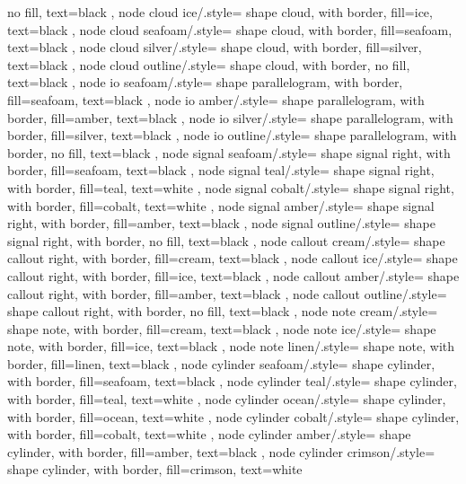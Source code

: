 {{		no fill, text=black
	},
	node cloud ice/.style={
		shape cloud, with border,
		fill=ice, text=black
	},
	node cloud seafoam/.style={
		shape cloud, with border,
		fill=seafoam, text=black
	},
	node cloud silver/.style={
		shape cloud, with border,
		fill=silver, text=black
	},
	node cloud outline/.style={
		shape cloud, with border,
		no fill, text=black
	},
	node io seafoam/.style={
		shape parallelogram, with border,
		fill=seafoam, text=black
	},
	node io amber/.style={
		shape parallelogram, with border,
		fill=amber, text=black
	},
	node io silver/.style={
		shape parallelogram, with border,
		fill=silver, text=black
	},
	node io outline/.style={
		shape parallelogram, with border,
		no fill, text=black
	},
	node signal seafoam/.style={
		shape signal right, with border,
		fill=seafoam, text=black
	},
	node signal teal/.style={
		shape signal right, with border,
		fill=teal, text=white
	},
	node signal cobalt/.style={
		shape signal right, with border,
		fill=cobalt, text=white
	},
	node signal amber/.style={
		shape signal right, with border,
		fill=amber, text=black
	},
	node signal outline/.style={
		shape signal right, with border,
		no fill, text=black
	},
	node callout cream/.style={
		shape callout right, with border,
		fill=cream, text=black
	},
	node callout ice/.style={
		shape callout right, with border,
		fill=ice, text=black
	},
	node callout amber/.style={
		shape callout right, with border,
		fill=amber, text=black
	},
	node callout outline/.style={
		shape callout right, with border,
		no fill, text=black
	},
	node note cream/.style={
		shape note, with border,
		fill=cream, text=black
	},
	node note ice/.style={
		shape note, with border,
		fill=ice, text=black
	},
	node note linen/.style={
		shape note, with border,
		fill=linen, text=black
	},
	node cylinder seafoam/.style={
		shape cylinder, with border,
		fill=seafoam, text=black
	},
	node cylinder teal/.style={
		shape cylinder, with border,
		fill=teal, text=white
	},
	node cylinder ocean/.style={
		shape cylinder, with border,
		fill=ocean, text=white
	},
	node cylinder cobalt/.style={
		shape cylinder, with border,
		fill=cobalt, text=white
	},
	node cylinder amber/.style={
		shape cylinder, with border,
		fill=amber, text=black
	},
	node cylinder crimson/.style={
		shape cylinder, with border,
		fill=crimson, text=white
}}
